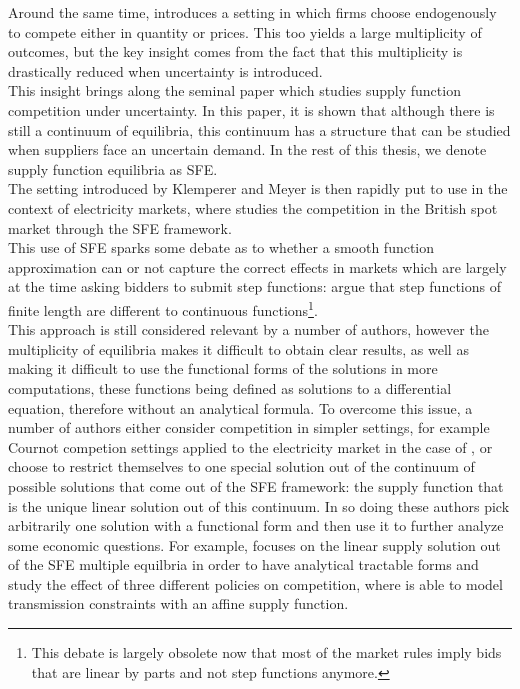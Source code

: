 Around the same time, \cite{klemperer1986price} introduces a setting in which firms choose endogenously to compete either in quantity or prices. This too yields a large multiplicity of outcomes, but the key insight comes from the fact that this multiplicity is drastically reduced when uncertainty is introduced.\\

This insight brings along the seminal paper \cite{KM} which studies supply function competition under uncertainty. In this paper, it is shown that although there is still a continuum of equilibria, this continuum has a structure that can be studied when suppliers face an uncertain demand. In the rest of this thesis, we denote supply function equilibria as SFE. \\

The setting introduced by Klemperer and Meyer is then rapidly put to use in the context of electricity markets, where \cite{Newgreen} studies the competition in the British spot market through the SFE framework. \\

This use of SFE sparks some debate as to whether a smooth function approximation can or not capture the correct effects in markets which are largely at the time asking bidders to submit step functions:  \cite{von1993spot} argue that step functions of finite length are different to continuous functions\footnote{This debate is largely obsolete now that most of the market rules imply bids that are linear by parts and not step functions anymore.}.\\

This approach is still considered relevant by a number of authors, however the multiplicity of equilibria makes it difficult to obtain clear results, as well as making it difficult to use the functional forms of the solutions in more computations, these functions being defined as solutions to a differential equation, therefore without an analytical formula. To overcome this issue, a number of authors either consider competition in simpler settings, for example Cournot competion settings applied to the electricity market in the case of \cite{borenstein1999empirical}, or choose to restrict themselves to one special solution out of the continuum of possible solutions that come out of the SFE framework: the supply function that is the unique linear solution out of this continuum. In so doing these authors pick arbitrarily one solution with a functional form and then use it to further analyze some economic questions. For example, \cite{green1996increasing} focuses on the linear supply solution out of the SFE multiple equilbria in order to have analytical tractable forms and study the effect of three different policies on competition, where 
\cite{hobbs2000strategic} is able to model transmission constraints with an affine supply function.\\


